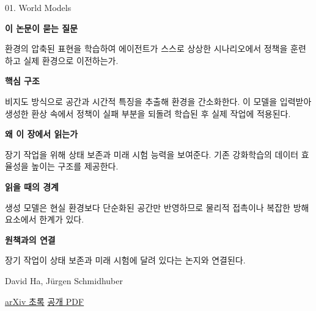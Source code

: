 \documentclass[11pt,openany]{book}
\begin{document}
\begin{termcard}{01. World Models}

\par

\medskip

{\sffamily\bfseries\color{deepblue} 이 논문이 묻는 질문}\par

환경의 압축된 표현을 학습하여 에이전트가 스스로 상상한 시나리오에서 정책을 훈련하고 실제 환경으로 이전하는가.

\smallskip

{\sffamily\bfseries\color{deepblue} 핵심 구조}\par

비지도 방식으로 공간과 시간적 특징을 추출해 환경을 간소화한다. 이 모델을 입력받아 생성한 환상 속에서 정책이 실패 부분을 되돌려 학습된 후 실제 작업에 적용된다.

\smallskip

{\sffamily\bfseries\color{deepblue} 왜 이 장에서 읽는가}\par

장기 작업을 위해 상태 보존과 미래 시험 능력을 보여준다. 기존 강화학습의 데이터 효율성을 높이는 구조를 제공한다.

\smallskip

{\sffamily\bfseries\color{coral} 읽을 때의 경계}\par

생성 모델은 현실 환경보다 단순화된 공간만 반영하므로 물리적 접촉이나 복잡한 방해 요소에서 한계가 있다.

\smallskip

{\sffamily\bfseries\color{teal} 원책과의 연결}\par

장기 작업이 상태 보존과 미래 시험에 달려 있다는 논지와 연결된다.

\medskip

{\footnotesize\color{muted} David Ha, Jürgen Schmidhuber\par

\href{https://arxiv.org/abs/1803.10122}{arXiv 초록} \quad \href{https://arxiv.org/pdf/1803.10122}{공개 PDF}\par}

\end{termcard}
\end{document}
